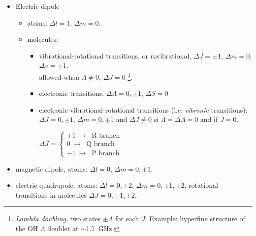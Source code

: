 
\begin{itemize} 
\item Electric dipole
\begin{itemize} 
\item  atoms: $\Delta l = 1$, $\Delta m = 0$. 
\item  molecules: 
\begin{itemize}  
\item vibrational-rotational transitions, or rovibrational,  $\Delta J
  = \pm 1$, $\Delta m = 0$,$\Delta v = \pm 1$,\\ allowed when $\Lambda \neq
0$, $\Delta J = 0$ \footnote{ {\em Lambda doubling}, two
states $\pm\Lambda$ for each $J$. Example: hyperfine structure of the
OH $\Lambda$ doublet at $\sim$1.7~GHz.}.
\item  electronic transitions, $\Delta \Lambda = 0, \pm 1$, $\Delta S = 0$\\
\item  electronic-vibrational-rotational transitions 
  (i.e. {\em vibronic} transitions): $\Delta J = 0, \pm 1 $, $\Delta m
  = 0, \pm 1$ and $\Delta J \neq 0$ si $\Lambda = \Delta \Lambda = 0$
  and if  $J = 0$.

  \medskip 

$\Delta J  =   \left\{  \begin{array}{l} 
+1~ \rightarrow~  \text{ R branch} \\
0~ \rightarrow~  \text{ Q branch} \\
-1~ \rightarrow~  \text{ P branch}  \end{array} \right. 
$
\end{itemize}
\end{itemize}
\item  magnetic dipole,  atoms: $\Delta l = 0$, $\Delta m = 0, \pm 1$. 
\item  electric quadrupole,  atoms: $\Delta l = 0, \pm 2$,
  $\Delta m = 0, \pm 1, \pm 2$, rotational transitions in molecules
  $\Delta J = 0, \pm 1, \pm 2$.
\end{itemize}



\vspace{-1cm}


